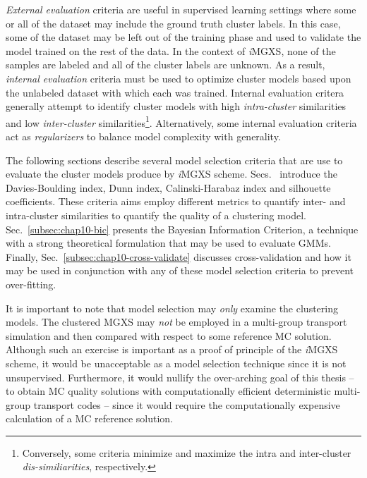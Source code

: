 \noindent \textit{External evaluation} criteria are useful in supervised learning settings where some or all of the dataset may include the ground truth cluster labels. In this case, some of the dataset may be left out of the training phase and used to validate the model trained on the rest of the data. In the context of \textit{i}\ac{MGXS}, none of the samples are labeled and all of the cluster labels are unknown. As a result, \textit{internal evaluation} criteria must be used to optimize cluster models based upon the unlabeled dataset with which each was trained. Internal evaluation critera generally attempt to identify cluster models with high \textit{intra-cluster} similarities and low \textit{inter-cluster} similarities\footnote{Conversely, some criteria minimize and maximize the intra and inter-cluster \textit{dis-similiarities}, respectively.}. Alternatively, some internal evaluation criteria act as \textit{regularizers} to balance model complexity with generality.

The following sections describe several model selection criteria that are use to evaluate the cluster models produce by \textit{i}\ac{MGXS} scheme. Secs.~ introduce the Davies-Boulding index, Dunn index, Calinski-Harabaz index and silhouette coefficients. These criteria aims employ different metrics to quantify inter- and intra-cluster similarities to quantify the quality of a clustering model. Sec.~\ref{subsec:chap10-bic} presents the Bayesian Information Criterion, a technique with a strong theoretical formulation that may be used to evaluate \acp{GMM}. Finally, Sec.~\ref{subsec:chap10-cross-validate} discusses cross-validation and how it may be used in conjunction with any of these model selection criteria to prevent over-fitting.

It is important to note that model selection may \textit{only} examine the clustering models. The clustered \ac{MGXS} may \textit{not} be employed in a multi-group transport simulation and then compared with respect to some reference \ac{MC} solution. Although such an exercise is important as a proof of principle of the \textit{i}\ac{MGXS} scheme, it would be unacceptable as a model selection technique since it is not unsupervised. Furthermore, it would nullify the over-arching goal of this thesis -- to obtain \ac{MC} quality solutions with computationally efficient deterministic multi-group transport codes -- since it would require the computationally expensive calculation of a \ac{MC} reference solution.

